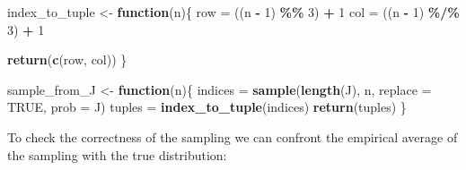 \documentclass[
]{article}
\newenvironment{Shaded}{\begin{snugshade}}{\end{snugshade}}
\newcommand{\AttributeTok}[1]{\textcolor[rgb]{0.13,0.29,0.53}{#1}}
\newcommand{\ConstantTok}[1]{\textcolor[rgb]{0.56,0.35,0.01}{#1}}
\newcommand{\ControlFlowTok}[1]{\textcolor[rgb]{0.13,0.29,0.53}{\textbf{#1}}}
\newcommand{\DecValTok}[1]{\textcolor[rgb]{0.00,0.00,0.81}{#1}}
\newcommand{\FunctionTok}[1]{\textcolor[rgb]{0.13,0.29,0.53}{\textbf{#1}}}
\newcommand{\NormalTok}[1]{#1}
\newcommand{\OtherTok}[1]{\textcolor[rgb]{0.56,0.35,0.01}{#1}}
\newcommand{\SpecialCharTok}[1]{\textcolor[rgb]{0.81,0.36,0.00}{\textbf{#1}}}
\newcommand{\StringTok}[1]{\textcolor[rgb]{0.31,0.60,0.02}{#1}}
\begin{document}
\begin{Shaded}
\begin{Highlighting}[]
\NormalTok{index\_to\_tuple }\OtherTok{\textless{}{-}} \ControlFlowTok{function}\NormalTok{(n)\{}
\NormalTok{  row }\OtherTok{=}\NormalTok{ ((n }\SpecialCharTok{{-}} \DecValTok{1}\NormalTok{) }\SpecialCharTok{\%\%} \DecValTok{3}\NormalTok{) }\SpecialCharTok{+} \DecValTok{1}
\NormalTok{  col }\OtherTok{=}\NormalTok{ ((n }\SpecialCharTok{{-}} \DecValTok{1}\NormalTok{) }\SpecialCharTok{\%/\%} \DecValTok{3}\NormalTok{) }\SpecialCharTok{+} \DecValTok{1}
  
  \FunctionTok{return}\NormalTok{(}\FunctionTok{c}\NormalTok{(row, col))}
\NormalTok{\}}

\NormalTok{sample\_from\_J }\OtherTok{\textless{}{-}} \ControlFlowTok{function}\NormalTok{(n)\{}
\NormalTok{  indices }\OtherTok{=} \FunctionTok{sample}\NormalTok{(}\FunctionTok{length}\NormalTok{(J), n, }\AttributeTok{replace =} \ConstantTok{TRUE}\NormalTok{, }\AttributeTok{prob =}\NormalTok{ J)}
\NormalTok{  tuples }\OtherTok{=} \FunctionTok{index\_to\_tuple}\NormalTok{(indices)}
  \FunctionTok{return}\NormalTok{(tuples)}
\NormalTok{\}}
\end{Highlighting}
\end{Shaded}

To check the correctness of the sampling we can confront the empirical
average of the sampling with the true distribution:

\begin{Shaded}
\end{Shaded}
\end{document}
